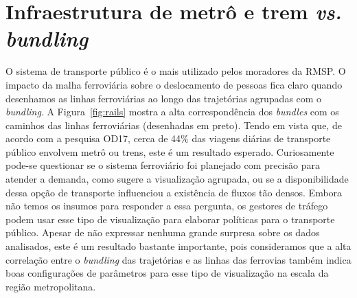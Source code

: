 
\section{Infraestrutura de metrô e trem \emph{vs.} \emph{bundling}}
\label{sec:trail-overlap}

O sistema de transporte público é o mais utilizado pelos moradores da RMSP. O
impacto da malha ferroviária sobre o deslocamento de pessoas fica claro quando
desenhamos as linhas ferroviárias ao longo das trajetórias agrupadas com o
\emph{bundling}. A Figura~\ref{fig:rails} mostra a alta correspondência dos
\emph{bundles} com os caminhos das linhas ferroviárias (desenhadas em preto).
Tendo em vista que, de acordo com a pesquisa OD17, cerca de 44\% das viagens
diárias de transporte público envolvem metrô ou trens, este é um resultado
esperado. Curiosamente pode-se questionar se o sistema ferroviário foi planejado
com precisão para atender a demanda, como sugere a visualização agrupada, ou se
a disponibilidade dessa opção de transporte influenciou a existência de fluxos
tão densos. Embora não temos os insumos para responder a essa pergunta, os
gestores de tráfego podem usar esse tipo de visualização para elaborar políticas
para o transporte público. Apesar de não expressar nenhuma grande surpresa sobre os
dados analisados, este é um resultado bastante importante, pois consideramos que a alta
correlação entre o \emph{bundling} das trajetórias e as linhas das ferrovias
também indica boas configurações de parâmetros para esse tipo de visualização na
escala da região metropolitana.

